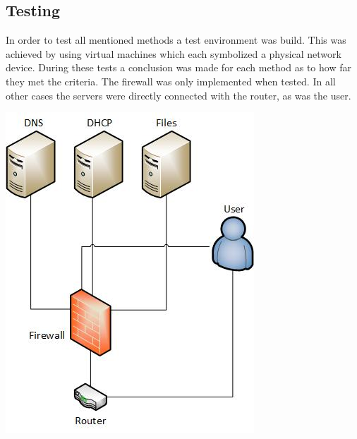 \documentclass[a0,portrait]{a0poster}
\begin{document}
\begin{multicols}{2}
\color{Black} %
\color{HoGentAccent1} 
\section*{Testing}
\color{black}
In order to test all mentioned methods a test environment was build. This was achieved by using virtual machines which each symbolized a physical network device. During these tests a conclusion was made for each method as to how far they met the criteria. The firewall was only implemented when tested. In all other cases the servers were directly connected with the router, as was the user.

\begin{center}\vspace{1cm}
\includegraphics[scale=2]{environment}
\end{center}\vspace{1cm}




\color{HoGentAccent1} 

\end{multicols}
\end{document}
